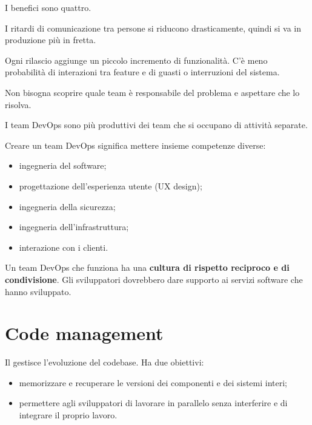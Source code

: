 I benefici sono quattro.
\begin{description}[leftmargin=0pt, style=unboxed]
  \item[Distribuzione più veloce.] I ritardi di comunicazione tra persone si riducono drasticamente, quindi si va in
    produzione più in fretta.
  \item[Rischio ridotto.] Ogni rilascio aggiunge un piccolo incremento di funzionalità. C'è meno probabilità di
    interazioni tra feature e di guasti o interruzioni del sistema.
  \item[Riparazione più veloce.] Non bisogna scoprire quale team è responsabile del problema e aspettare che lo
    risolva.
  \item[Team più produttivi.] I team DevOps sono più produttivi dei team che si occupano di attività separate.
\end{description}

Creare un team DevOps significa mettere insieme competenze diverse:
\begin{itemize}
  \item ingegneria del software;
  \item progettazione dell'esperienza utente (UX design);
  \item ingegneria della sicurezza;
  \item ingegneria dell'infrastruttura;
  \item interazione con i clienti.
\end{itemize}
Un team DevOps che funziona ha una \textbf{cultura di rispetto reciproco e di condivisione}. Gli sviluppatori
dovrebbero dare supporto ai servizi software che hanno sviluppato.

\section{Code management}
\label{sec:devops-codice}

\begin{definizione}
Il  gestisce l'evoluzione del codebase. Ha due obiettivi:
\begin{itemize}
  \item memorizzare e recuperare le versioni dei componenti e dei sistemi interi;
  \item permettere agli sviluppatori di lavorare in parallelo senza interferire e di integrare il proprio lavoro.
\end{itemize}
\end{definizione}

